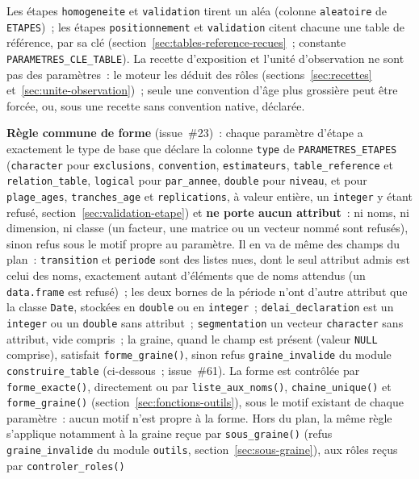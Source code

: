 \documentclass[a4paper,11pt]{article}
\newcommand{\code}[1]{\texttt{\small #1}}
\begin{document}
{\sloppy\noindent
Les étapes \code{homogeneite} et \code{validation} tirent un aléa
(colonne \code{aleatoire} de \code{ETAPES})~; les étapes \code{positionnement} et \code{validation}
citent chacune une table de référence, par sa clé
(section~\ref{sec:tables-reference-recues}~; constante
\code{PARAMETRES\_CLE\_TABLE}). La recette d'exposition et l'unité
d'observation ne sont pas des paramètres~: le moteur les déduit des rôles
(sections~\ref{sec:recettes} et~\ref{sec:unite-observation})~; seule une
convention d'âge plus grossière peut être forcée, ou, sous une recette sans
convention native, déclarée.\par}

\noindent
\textbf{Règle commune de forme} (issue~\#23)~: chaque paramètre d'étape a
exactement le type de base que déclare la colonne \code{type} de
\code{PARAMETRES\_ETAPES} (\code{character} pour \code{exclusions},
\code{convention}, \code{estimateurs}, \code{table\_reference} et
\code{relation\_table}, \code{logical} pour \code{par\_annee},
\code{double} pour \code{niveau}, et pour \code{plage\_ages},
\code{tranches\_age} et \code{replications}, à valeur entière, un
\code{integer} y étant refusé, section~\ref{sec:validation-etape}) et \textbf{ne porte
aucun attribut}~: ni noms, ni dimension, ni classe (un facteur, une matrice
ou un vecteur nommé sont refusés), sinon refus sous le motif propre au
paramètre. Il en va de même des champs du plan~: \code{transition} et
\code{periode} sont des listes nues, dont le seul attribut admis est celui
des noms, exactement autant d'éléments que de noms attendus (un
\code{data.frame} est refusé)~; les deux bornes de la période n'ont
d'autre attribut que la classe \code{Date}, stockées en \code{double} ou en
\code{integer}~; \code{delai\_declaration} est un \code{integer} ou un
\code{double} sans attribut~; \code{segmentation} un vecteur
\code{character} sans attribut, vide compris~; la graine, quand le champ
est présent (valeur \code{NULL} comprise), satisfait \code{forme\_graine()},
sinon refus \code{graine\_invalide} du module \code{construire\_table}
(ci-dessous~; issue~\#61). La forme est contrôlée par
\code{forme\_exacte()}, directement ou par \code{liste\_aux\_noms()},
\code{chaine\_unique()} et \code{forme\_graine()}
(section~\ref{sec:fonctions-outils}), sous le motif
existant de chaque paramètre~: aucun motif n'est propre à la forme. Hors du
plan, la même règle s'applique notamment à la graine reçue par
\code{sous\_graine()} (refus \code{graine\_invalide} du module
\code{outils}, section~\ref{sec:sous-graine}), aux rôles reçus par \code{controler\_roles()}
\end{document}
